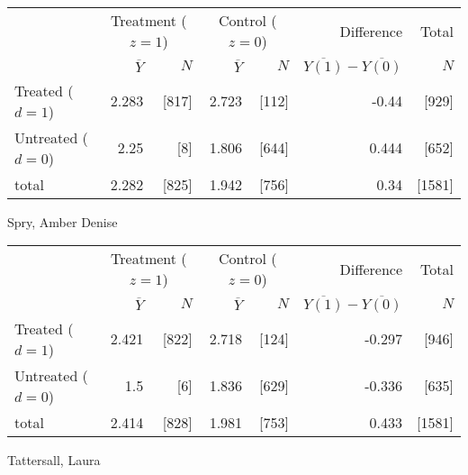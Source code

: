 \documentclass[11pt,notitlepage]{article}
\begin{document}
\begin{table}[h!]
\begin{center}
\begin{tabular}{l|rr|rr|rr}
  \hline
 & \multicolumn{2}{c|}{Treatment ($z=1$)} & \multicolumn{2}{c|}{Control ($z=0$)} & Difference & Total \\
 & $\overline{Y}$ & $N$ & $\overline{Y}$ & $N$ & $\overline{Y(1)} - \overline{Y(0)}$ & $N$ \\ 
  \hline
Treated ($d=1$) &  2.283 & [817] & 2.723 & [112] & -0.44 & [929] \\ 
  Untreated ($d=0$) & 2.25 & [8] & 1.806 & [644] & 0.444 & [652] \\ 
  \hline
  total & 2.282 & [825] & 1.942 & [756] & 0.34 & [1581] \\ 
   \hline
\end{tabular}
\end{center}
\end{table}
Spry, Amber Denise

\begin{table}[h!]
\begin{center}
\begin{tabular}{l|rr|rr|rr}
  \hline
 & \multicolumn{2}{c|}{Treatment ($z=1$)} & \multicolumn{2}{c|}{Control ($z=0$)} & Difference & Total \\
 & $\overline{Y}$ & $N$ & $\overline{Y}$ & $N$ & $\overline{Y(1)} - \overline{Y(0)}$ & $N$ \\ 
  \hline
Treated ($d=1$) &  2.421 & [822] & 2.718 & [124] & -0.297 & [946] \\ 
  Untreated ($d=0$) & 1.5 & [6] & 1.836 & [629] & -0.336 & [635] \\ 
  \hline
  total & 2.414 & [828] & 1.981 & [753] & 0.433 & [1581] \\ 
   \hline
\end{tabular}
\end{center}
\end{table}

\clearpage

Tattersall, Laura
\end{document}
